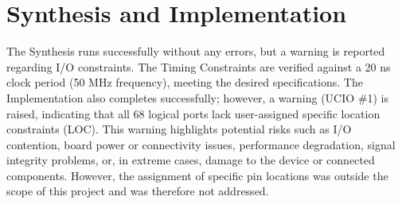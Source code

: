 \section{Synthesis and Implementation}
The Synthesis runs successfully without any errors, 
but a warning is reported regarding I/O constraints. 
The Timing Constraints are verified against a 20 ns clock period (50 MHz frequency), 
meeting the desired specifications. The 
Implementation also completes successfully; however, a 
warning (UCIO \#1) is raised, indicating that all 68 
logical ports lack user-assigned specific location 
constraints (LOC). This warning highlights potential 
risks such as I/O contention, board power or connectivity 
issues, performance degradation, signal integrity problems, 
or, in extreme cases, damage to the device or connected 
components. However, the assignment of specific pin 
locations was outside the scope of this project and was 
therefore not addressed.




